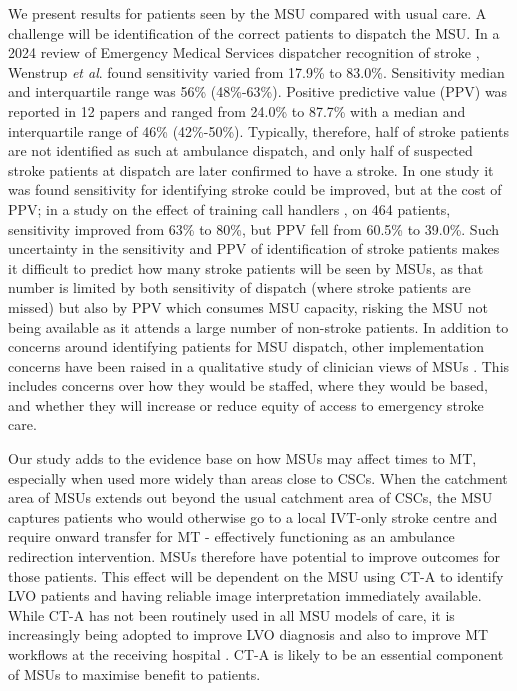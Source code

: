 We present results for patients seen by the MSU compared with usual care. A challenge will be identification of the correct patients to dispatch the MSU. In a 2024 review of Emergency Medical Services dispatcher recognition of stroke \cite{wenstrup_emergency_2024}, Wenstrup \textit{et al}. found sensitivity varied from 17.9\% to 83.0\%. Sensitivity median and interquartile range was 56\% (48\%-63\%). Positive predictive value (PPV) was reported in 12 papers and ranged from 24.0\% to 87.7\% with a median and interquartile range of 46\% (42\%-50\%). Typically, therefore, half of stroke patients are not identified as such at ambulance dispatch, and only half of suspected stroke patients at dispatch are later confirmed to have a stroke. In one study it was found sensitivity for identifying stroke could be improved, but at the cost of PPV; in a study on the effect of training call handlers \cite{watkins_training_2013}, on 464 patients, sensitivity improved from 63\% to 80\%, but PPV fell from 60.5\% to 39.0\%. Such uncertainty in the sensitivity and PPV of identification of stroke patients makes it difficult to predict how many stroke patients will be seen by MSUs, as that number is limited by both sensitivity of dispatch (where stroke patients are missed) but also by PPV which consumes MSU capacity, risking the MSU not being available as it attends a large number of non-stroke patients. In addition to concerns around identifying patients for MSU dispatch, other implementation concerns have been raised in a qualitative study of clinician views of MSUs \cite{moseley_practitioner_2024}. This includes concerns over how they would be staffed, where they would be based, and whether they will increase or reduce equity of access to emergency stroke care.

Our study adds to the evidence base on how MSUs may affect times to MT, especially when used more widely than areas close to CSCs. When the catchment area of MSUs extends out beyond the usual catchment area of CSCs, the MSU captures patients who would otherwise go to a local IVT-only stroke centre and require onward transfer for MT - effectively functioning as an ambulance redirection intervention. MSUs therefore have potential to improve outcomes for those patients. This effect will be dependent on the MSU using CT-A to identify LVO patients and having reliable image interpretation immediately available. While CT-A has not been routinely used in all MSU models of care, it is increasingly being adopted to improve LVO diagnosis and also to improve MT workflows at the receiving hospital \cite{czap_mobile_2020}. CT-A is likely to be an essential component of MSUs to maximise benefit to patients. 

